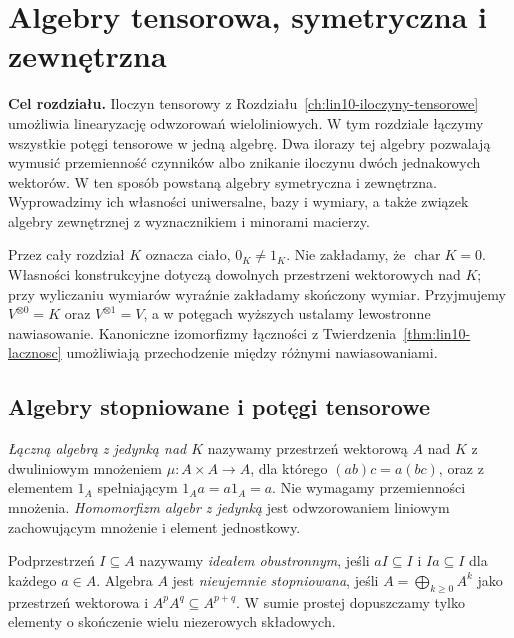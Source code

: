 \chapter{Algebry tensorowa, symetryczna i zewnętrzna}
\label{ch:lin11-algebry}

\providecommand{\atlasref}[2]{#2}

\noindent\textbf{Cel rozdziału.}
Iloczyn tensorowy z Rozdziału~\ref{ch:lin10-iloczyny-tensorowe}
umożliwia linearyzację odwzorowań wieloliniowych.
W tym rozdziale łączymy wszystkie potęgi tensorowe
w jedną algebrę. Dwa ilorazy tej algebry pozwalają
wymusić przemienność czynników albo znikanie iloczynu
dwóch jednakowych wektorów. W ten sposób powstaną
algebry symetryczna i zewnętrzna. Wyprowadzimy ich
własności uniwersalne, bazy i wymiary, a także
związek algebry zewnętrznej z wyznacznikiem
i minorami macierzy.

Przez cały rozdział \(K\) oznacza ciało, \(0_K\ne1_K\).
Nie zakładamy, że \(\operatorname{char}K=0\).
Własności konstrukcyjne dotyczą dowolnych przestrzeni
wektorowych nad \(K\); przy wyliczaniu wymiarów
wyraźnie zakładamy skończony wymiar. Przyjmujemy
\(V^{\otimes0}=K\) oraz \(V^{\otimes1}=V\), a w potęgach
wyższych ustalamy lewostronne nawiasowanie.
Kanoniczne izomorfizmy łączności z
Twierdzenia~\ref{thm:lin10-lacznosc} umożliwiają
przechodzenie między różnymi nawiasowaniami.

\section{Algebry stopniowane i potęgi tensorowe}
\label{sec:lin11-podstawy}

\begin{definicja}
\label{def:lin11-algebra}
\emph{Łączną algebrą z jedynką nad \(K\)}
nazywamy przestrzeń wektorową \(A\) nad \(K\)
z dwuliniowym mnożeniem
\(\mu\colon A\times A\to A\), dla którego
\((ab)c=a(bc)\), oraz z elementem \(1_A\)
spełniającym \(1_Aa=a1_A=a\).
Nie wymagamy przemienności mnożenia.
\emph{Homomorfizm algebr z jedynką}
jest odwzorowaniem liniowym zachowującym
mnożenie i element jednostkowy.

Podprzestrzeń \(I\subseteq A\)
nazywamy \emph{ideałem obustronnym},
jeśli \(aI\subseteq I\) i \(Ia\subseteq I\)
dla każdego \(a\in A\).
Algebra \(A\) jest \emph{nieujemnie stopniowana},
jeśli
\(A=\bigoplus_{k\geq0} A^k\) jako przestrzeń
wektorowa i \(A^pA^q\subseteq A^{p+q}\).
W sumie prostej dopuszczamy tylko elementy
o skończenie wielu niezerowych składowych.
\end{definicja}

